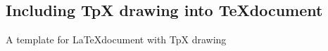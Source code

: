 \documentclass[a4paper,10pt]{article}
\begin{document}
\subsection{Including TpX drawing into \TeX document}

A template for \LaTeX document with TpX drawing


\end{document}
